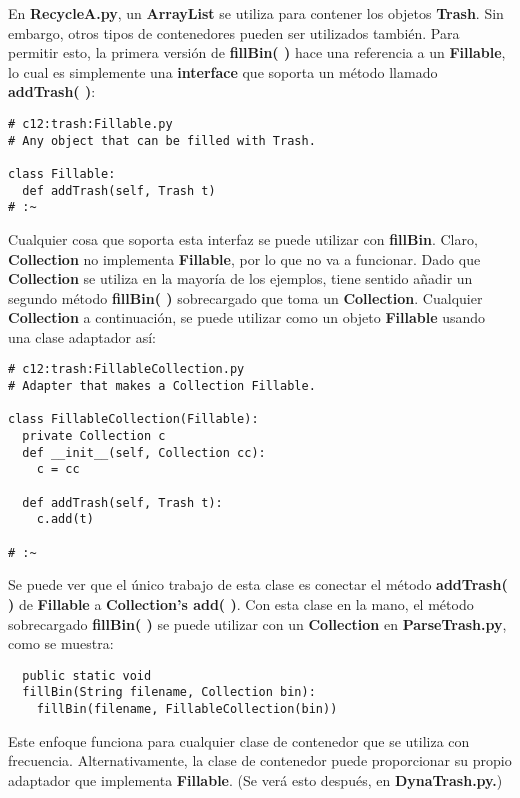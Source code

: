 En \textbf{RecycleA.py}, un \textbf{ArrayList} se utiliza para contener los objetos \textbf{Trash}. Sin embargo, otros tipos de contenedores pueden ser utilizados también. Para permitir esto, la primera versión de \textbf{fillBin( )} hace una referencia a un \textbf{Fillable}, lo cual es simplemente una \textbf{interface} que soporta un método llamado \textbf{addTrash( )}:     \newline

\begin{lstlisting} 
# c12:trash:Fillable.py  
# Any object that can be filled with Trash.

class Fillable: 
  def addTrash(self, Trash t) 
# :~ 
\end{lstlisting}

Cualquier cosa que soporta esta interfaz se puede utilizar con \textbf{fillBin}. Claro, \textbf{Collection} no implementa \textbf{Fillable}, por lo que no va a funcionar. Dado que \textbf{Collection} se utiliza en la mayoría de los ejemplos, tiene sentido añadir un segundo método \textbf{fillBin( )} sobrecargado que toma un \textbf{Collection}. Cualquier \textbf{Collection} a continuación, se puede utilizar como un objeto \textbf{Fillable} usando una clase adaptador así:   \newline

\begin{lstlisting} 
# c12:trash:FillableCollection.py  
# Adapter that makes a Collection Fillable. 

class FillableCollection(Fillable): 
  private Collection c 
  def __init__(self, Collection cc):  
    c = cc  
    
  def addTrash(self, Trash t): 
    c.add(t) 
    
# :~ 
\end{lstlisting}

Se puede ver que el único trabajo de esta clase es conectar el método \textbf{addTrash( )} de \textbf{Fillable} a \textbf{Collection’s add( )}. Con esta clase en la mano, el método sobrecargado \textbf{fillBin( )}  se puede utilizar con un \textbf{Collection} en \textbf{ParseTrash.py}, como se muestra:   \newline

\begin{lstlisting} 
  public static void  
  fillBin(String filename, Collection bin): 
    fillBin(filename, FillableCollection(bin)) 
\end{lstlisting}

Este enfoque funciona para cualquier clase de contenedor que se utiliza con frecuencia. Alternativamente, la clase de contenedor puede proporcionar su propio adaptador que implementa \textbf{Fillable}. (Se verá esto después, en \textbf{DynaTrash.py.})     \newline



